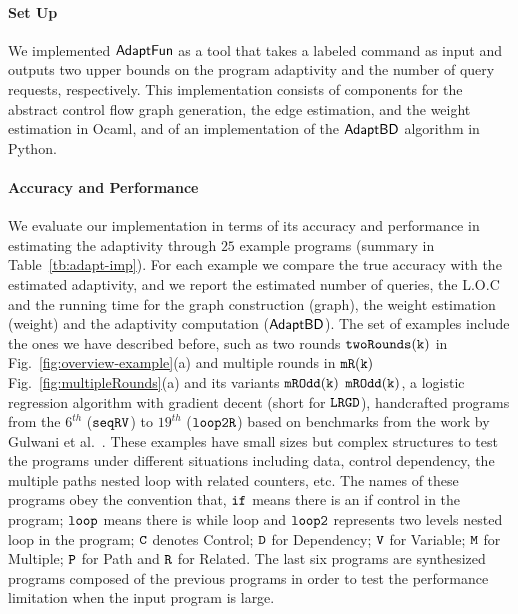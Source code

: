 
\paragraph{Set Up}
We implemented $\textsf{AdaptFun}$ as a tool that takes a labeled command as input 
and outputs two upper bounds on the program adaptivity and the number of query requests, respectively.
This implementation consists of components for the 
abstract control flow graph generation,
the edge estimation, and the weight estimation in Ocaml, 
and of an implementation of the $\mathsf{AdaptBD}$ algorithm in Python.


\paragraph{Accuracy and Performance}

We evaluate our implementation in terms of its accuracy and performance in estimating the adaptivity
through $25$ example programs (summary in Table~\ref{tb:adapt-imp}).
For each example we compare the true accuracy with the estimated adaptivity, and we report the estimated number of queries, the L.O.C and the running time for the graph construction (graph), the weight estimation (weight) and the adaptivity computation ($\mathsf{AdaptBD}$).
The set of examples include the ones we have described before, such as two rounds $\mathtt{twoRounds(k)}$ in
Fig.~\ref{fig:overview-example}(a) and multiple rounds in $ \mathtt{mR(k)}$ Fig.~\ref{fig:multipleRounds}(a) and its variants $\mathtt{mROdd(k)}$ $\mathtt{mROdd(k)}$,
a logistic regression algorithm with gradient decent (short for $\mathtt{LRGD}$),
handcrafted programs from the $6^{th}$ ($\mathtt{seqRV}$) to $19^{th}$ ($\mathtt{loop2R}$) based on benchmarks from the work by Gulwani et al.~\cite{GulwaniJK09}. These examples have small sizes but complex structures to test the programs under different situations including
data, control dependency, the multiple paths nested loop with related counters, etc. The names of these programs obey the convention that,
$\mathtt{if}$ means there is an if control in the program;
$\mathtt{loop}$ means there is while loop and $\mathtt{loop2}$ represents two levels nested loop in the program;
$\mathtt{C}$ denotes Control;
$\mathtt{D}$ for Dependency; $\mathtt{V}$ for Variable;
$\mathtt{M}$ for Multiple; $\mathtt{P}$ for Path and $\mathtt{R}$ for Related.
The last six programs are synthesized programs composed of the previous programs in order to test the performance limitation when the input program is large. 


